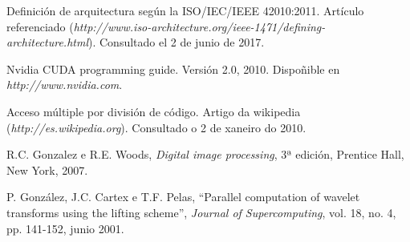

\begin{thebibliography}{99}
	
 Definición de arquitectura según la ISO/IEC/IEEE 42010:2011. Artículo referenciado ({\it http://www.iso-architecture.org/ieee-1471/defining-architecture.html}). Consultado el 2 de junio de 2017.

	
 Nvidia CUDA programming guide. Versión 2.0, 2010. Dispoñible en {\it http://www.nvidia.com}.

 Acceso múltiple por división de código. Artigo da wikipedia ({\it http://es.wikipedia.org}). Consultado o 2 de xaneiro do 2010.

 R.C. Gonzalez e R.E. Woods, {\it Digital image processing}, 3ª edición, Prentice Hall, New York, 2007.

 P. González, J.C. Cartex e T.F. Pelas, ``Parallel computation of wavelet transforms using the lifting scheme'', {\it Journal of Supercomputing}, vol. 18, no. 4, pp. 141-152, junio 2001.
\end{thebibliography}

